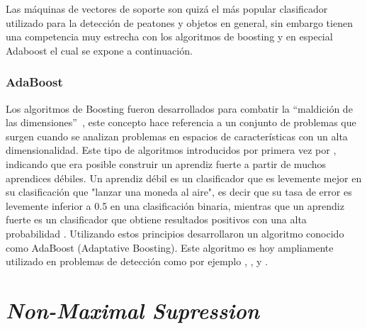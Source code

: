 
Las máquinas de vectores de soporte son quizá el más popular clasificador utilizado para la detección de peatones y objetos en general, sin embargo tienen una competencia muy estrecha con los algoritmos de boosting y en especial Adaboost el cual se expone a continuación.

\subsubsection{AdaBoost}

Los algoritmos de Boosting fueron desarrollados para combatir la ``maldición de las dimensiones''~\citep{bellman1961adaptive}, este concepto hace referencia a un conjunto de problemas que surgen cuando se analizan problemas en espacios de características con un alta dimensionalidad. 
Este tipo de algoritmos introducidos por primera vez por \cite{Schapire1990}, indicando que era posible construir un aprendiz fuerte a partir de muchos aprendices débiles. Un aprendiz débil es un clasificador que es levemente mejor en su clasificación que "lanzar una moneda al aire", es decir que su tasa de error es levemente inferior a 0.5 en una clasificación binaria, mientras que un aprendiz fuerte es un clasificador que obtiene resultados positivos con una alta probabilidad \citep{Kearns1994}. Utilizando estos principios \cite{Freund1995} desarrollaron un algoritmo conocido como AdaBoost (Adaptative Boosting). Este algoritmo es hoy ampliamente utilizado en problemas de detección como por ejemplo \cite{viola2001}, \cite{dollar2009a}, \cite{Dollar2010} y \cite{wojek2008}. 

\section{\textit{Non-Maximal Supression}}
\label{preliminares:nms}


